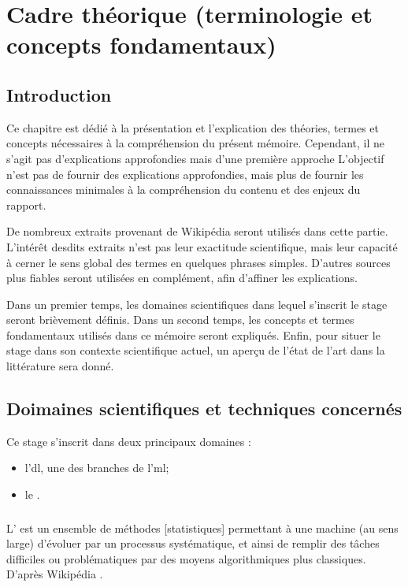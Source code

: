 \chapter[Cadre théorique]{Cadre théorique (terminologie et concepts fondamentaux) \label{ch:sci_framework}}

\section{Introduction} %
Ce chapitre est dédié à la présentation et l'explication des théories, termes et concepts nécessaires à la compréhension du présent mémoire.
Cependant, il ne s'agit pas d'explications approfondies mais d'une première approche %
L'objectif n'est pas de fournir des explications approfondies, mais plus de fournir les connaissances minimales à la compréhension du contenu et des enjeux du rapport.

De nombreux extraits provenant de Wikipédia seront utilisés dans cette partie. L'intérêt desdits extraits n'est pas leur exactitude scientifique, mais leur capacité à cerner le sens global des termes en quelques phrases simples.
D'autres sources plus fiables seront utilisées en complément, afin d'affiner les explications. 

Dans un premier temps, les domaines scientifiques dans lequel s'inscrit le stage seront brièvement définis.
Dans un second temps, les concepts et termes fondamentaux utilisés dans ce mémoire seront expliqués.
Enfin, pour situer le stage dans son contexte scientifique actuel, un aperçu de l'état de l'art dans la littérature sera donné.

\section{Doimaines scientifiques et techniques concernés} %
Ce stage s'inscrit dans deux principaux domaines :
\begin{itemize}
	\item l'\gls{dl}, une des branches de l'\gls{ml};
	\item le .
\end{itemize}

\subsection{} \label{subsec:ml}\label{def:ml}
L' est un ensemble de \og méthodes [statistiques] permettant à une machine (au sens large) d'évoluer par un processus systématique, et ainsi de remplir des tâches difficiles ou problématiques par des moyens algorithmiques plus classiques\fg{}. D'après Wikipédia .


